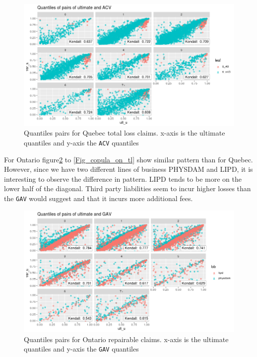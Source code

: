 	\begin{figure}[H]
		\begin{center}
			\includegraphics[scale=0.4]{Graphiques/qc_tl} 
			\renewcommand{\figurename}{Figure}
			\caption{Quantiles pairs for Quebec total loss claims. x-axis is the ultimate quantiles and y-axis the \texttt{ACV} quantiles}\label{Fig_copula_qc_tl}
		\end{center}
	\end{figure}

	For Ontario figure\ref{Fig_copula_on_rep} to \ref{Fig_copula_on_tl} show similar pattern than for Quebec. However, since we have two different lines of business PHYSDAM and LIPD, it is interesting to observe the difference in pattern. LIPD tends to be more on the lower half of the diagonal. Third party liabilities seem to incur higher losses than the \texttt{GAV} would suggest and that it incurs more additional fees. 
	
		\begin{figure}[H]
		\begin{center}
			\includegraphics[scale=0.4]{Graphiques/on_rep} 
			\renewcommand{\figurename}{Figure}
			\caption{Quantiles pairs for Ontario repairable claims. x-axis is the ultimate quantiles and y-axis the \texttt{GAV} quantiles}\label{Fig_copula_on_rep}
		\end{center}
	\end{figure}
	
